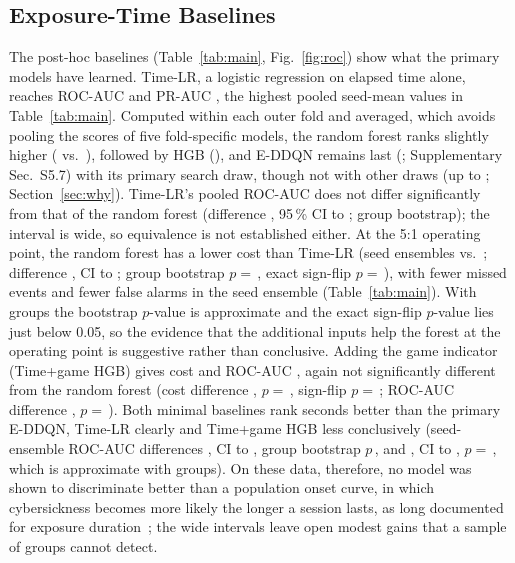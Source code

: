 \subsection{Exposure-Time Baselines}
\label{sec:time}
The post-hoc baselines (Table~\ref{tab:main}, Fig.~\ref{fig:roc}) show what the primary models have learned. Time-LR, a logistic regression on elapsed time alone, reaches ROC-AUC \PHTimeLRRocAucMean{} and PR-AUC \PHTimeLRPrAucMean, the highest pooled seed-mean values in Table~\ref{tab:main}. Computed within each outer fold and averaged, which avoids pooling the scores of five fold-specific models, the random forest ranks slightly higher (\PHWfRFAuc{} vs.\ \PHWfTimeLRAuc), followed by HGB (\PHWfHGBAuc), and E-DDQN remains last (\PHWfEDDQNAuc; Supplementary Sec.~S5.7) with its primary search draw, though not with other draws (up to \SDEDDQNWfMax; Section~\ref{sec:why}). Time-LR's pooled ROC-AUC does not differ significantly from that of the random forest (difference \PHTimeLRvsRFAuc, 95\,\% CI \PHTimeLRvsRFAucLow{} to \PHTimeLRvsRFAucHigh; group bootstrap); the interval is wide, so equivalence is not established either. At the 5:1 operating point, the random forest has a lower cost than Time-LR (seed ensembles \PHEnsRFCost{} vs.\ \PHEnsTimeLRCost; difference \PHTimeLRvsRFCost, CI \PHTimeLRvsRFCostLow{} to \PHTimeLRvsRFCostHigh; group bootstrap $p=$\,\PHTimeLRvsRFCostP, exact sign-flip $p=$\,\PHSfTimeLRvsRFP), with fewer missed events and fewer false alarms in the seed ensemble (Table~\ref{tab:main}). With \nGroupsEval{} groups the bootstrap $p$-value is approximate and the exact sign-flip $p$-value lies just below 0.05, so the evidence that the additional inputs help the forest at the operating point is suggestive rather than conclusive. Adding the game indicator (Time+game HGB) gives cost \PHTimeHGBCostMean{} and ROC-AUC \PHTimeHGBRocAucMean, again not significantly different from the random forest (cost difference \PHTimeHGBvsRFCost, $p=$\,\PHTimeHGBvsRFCostP{}, sign-flip $p=$\,\PHSfTimeHGBvsRFP; ROC-AUC difference \PHTimeHGBvsRFAuc, $p=$\,\PHTimeHGBvsRFAucP). Both minimal baselines rank seconds better than the primary E-DDQN, Time-LR clearly and Time+game HGB less conclusively (seed-ensemble ROC-AUC differences \PHTimeLRvsEDDQNAuc, CI \PHTimeLRvsEDDQNAucLow{} to \PHTimeLRvsEDDQNAucHigh, group bootstrap $p$\,\PHTimeLRvsEDDQNAucP, and \PHTimeHGBvsEDDQNAuc, CI \PHTimeHGBvsEDDQNAucLow{} to \PHTimeHGBvsEDDQNAucHigh, $p=$\,\PHTimeHGBvsEDDQNAucP, which is approximate with \nGroupsEval{} groups). On these data, therefore, no model was shown to discriminate better than a population onset curve, in which cybersickness becomes more likely the longer a session lasts, as long documented for exposure duration~\cite{kennedy2000duration}; the wide intervals leave open modest gains that a sample of \nGroupsEval{} groups cannot detect.

